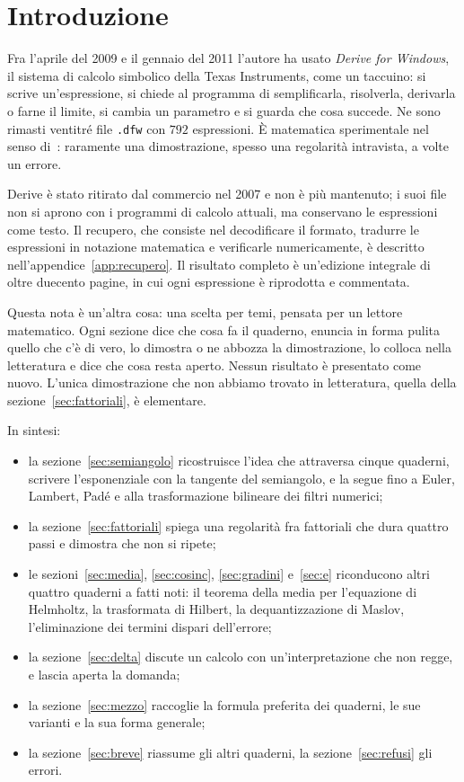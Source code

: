 \section{Introduzione}
\label{sec:intro}

Fra l'aprile del 2009 e il gennaio del 2011 l'autore ha usato \emph{Derive
for Windows}, il sistema di calcolo simbolico della Texas Instruments, come
un taccuino: si scrive un'espressione, si chiede al programma di
semplificarla, risolverla, derivarla o farne il limite, si cambia un
parametro e si guarda che cosa succede. Ne sono rimasti ventitr\'e file
\texttt{.dfw} con $792$ espressioni. \`E matematica sperimentale nel senso
di~\cite{borwein2008}: raramente una dimostrazione, spesso una regolarit\`a
intravista, a volte un errore.

Derive \`e stato ritirato dal commercio nel 2007 e non \`e pi\`u mantenuto; i
suoi file non si aprono con i programmi di calcolo attuali, ma conservano le
espressioni come testo. Il recupero, che
consiste nel decodificare il formato, tradurre le espressioni in notazione
matematica e verificarle numericamente, \`e descritto
nell'appendice~\ref{app:recupero}. Il risultato completo \`e un'edizione
integrale di oltre duecento pagine, in cui ogni espressione \`e riprodotta e
commentata.

Questa nota \`e un'altra cosa: una scelta per temi, pensata per un lettore
matematico. Ogni sezione dice che cosa fa il quaderno, enuncia in forma
pulita quello che c'\`e di vero, lo dimostra o ne abbozza la dimostrazione,
lo colloca nella letteratura e dice che cosa resta aperto. Nessun risultato
\`e presentato come nuovo. L'unica dimostrazione che non abbiamo trovato in
letteratura, quella della sezione~\ref{sec:fattoriali}, \`e elementare.

In sintesi:
\begin{itemize}[leftmargin=1.4em,itemsep=1pt]
  \item la sezione~\ref{sec:semiangolo} ricostruisce l'idea che attraversa
        cinque quaderni, scrivere l'esponenziale con la tangente del
        semiangolo, e la segue fino a Euler, Lambert, Pad\'e e alla
        trasformazione bilineare dei filtri numerici;
  \item la sezione~\ref{sec:fattoriali} spiega una regolarit\`a fra
        fattoriali che dura quattro passi e dimostra che non si ripete;
  \item le sezioni~\ref{sec:media}, \ref{sec:cosinc}, \ref{sec:gradini}
        e~\ref{sec:e} riconducono altri quattro quaderni a fatti noti: il
        teorema della media per l'equazione di Helmholtz, la trasformata di
        Hilbert, la dequantizzazione di Maslov, l'eliminazione dei termini
        dispari dell'errore;
  \item la sezione~\ref{sec:delta} discute un calcolo con un'interpretazione
        che non regge, e lascia aperta la domanda;
  \item la sezione~\ref{sec:mezzo} raccoglie la formula preferita dei
        quaderni, le sue varianti e la sua forma generale;
  \item la sezione~\ref{sec:breve} riassume gli altri quaderni, la
        sezione~\ref{sec:refusi} gli errori.
\end{itemize}

